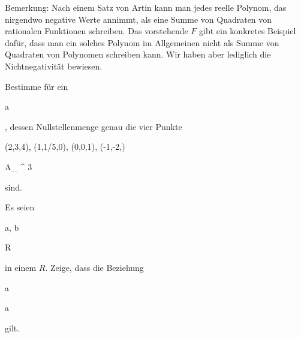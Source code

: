 {Bemerkung: Nach einem Satz von Artin
 {} {}
kann man jedes reelle Polynom, das nirgendwo negative Werte annimmt, als eine Summe von Quadraten von rationalen Funktionen schreiben. Das vorstehende  {} $F$ gibt ein konkretes Beispiel dafür, dass man ein solches Polynom im Allgemeinen nicht als Summe von Quadraten von Polynomen schreiben kann. Wir haben aber lediglich die Nichtnegativität bewiesen.} {}




{}


{


Bestimme
für ein


\mavergleichskette


{\vergleichskette


{ {\mathfrak a}
}


{ \subseteq }{ \R [X,Y,Z]
}


{  }{
}


{    }{
}


{   }{
}


}
{}{}{,}
dessen Nullstellenmenge genau die vier Punkte


\mavergleichskettedisp


{\vergleichskette


{ (2,3,4), (1,1/5,0), (0,0,1), (-1,-2,)
}


{ \in} { { {\mathbb A}_{ \R }^{  3   } }
}


{ } {
}


{ } {
}


{ } {
}


}
{}{}{}
sind.


}


{} {}




{}


{


Es seien


\mavergleichskette


{\vergleichskette


{ {\mathfrak a}, {\mathfrak b}
}


{ \subseteq }{ R
}


{  }{
}


{    }{
}


{   }{
}


}
{}{}{}
in einem
$R$. Zeige, dass die Beziehung


\mavergleichskettedisp


{\vergleichskette


{ {\mathfrak a} 
}


{ \subseteq} { {\mathfrak a} 
}


{ } {
}


{ } {
}


{ } {
}


}
{}{}{}
gilt.


}


